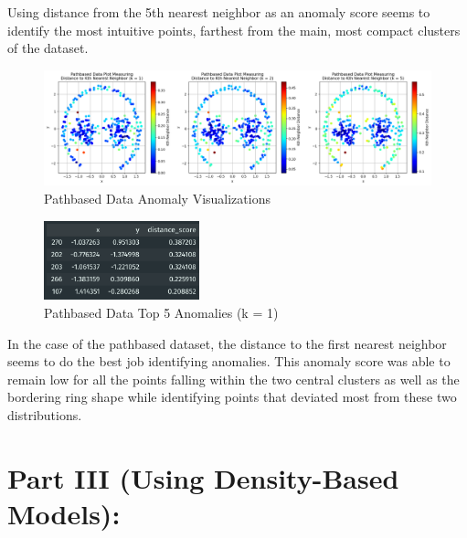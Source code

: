 \documentclass{article}
\begin{document}
Using distance from the 5th nearest neighbor as an anomaly score seems to identify the most intuitive points,
farthest from the main, most compact clusters of the dataset.

\begin{figure}[H]
    \centering
    \includegraphics[width=\textwidth]{p2_p3.png}
    \caption{Pathbased Data Anomaly Visualizations}
\end{figure}
\begin{figure}[H]
    \centering
    \includegraphics[width=0.4\textwidth]{p2_d3.png}
    \caption{Pathbased Data Top 5 Anomalies (k = 1)}
\end{figure}

In the case of the pathbased dataset, the distance to the first nearest neighbor seems to
do the best job identifying anomalies. This anomaly score was able to remain low for all the
points falling within the two central clusters as well as the bordering ring shape while
identifying points that deviated most from these two distributions.


\section{Part III (Using Density-Based Models):}
\end{document}

